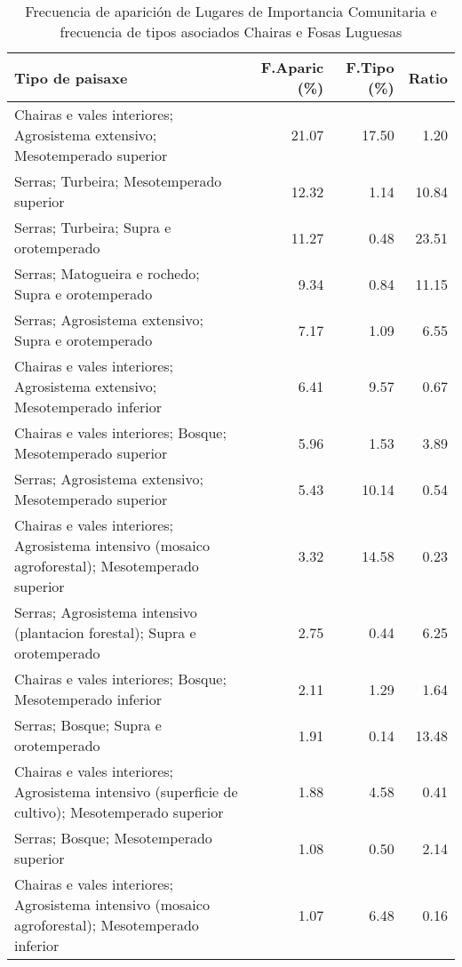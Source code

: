 \begin{table}[p]
\centering
\caption{Frecuencia de aparición de Lugares de Importancia Comunitaria e frecuencia de tipos asociados Chairas e Fosas Luguesas} 
\label{vnatura6}
\begin{tabular}{lrrr}
  \hline
Tipo de paisaxe & F.Aparic (\%) & F.Tipo (\%) & Ratio \\ 
  \hline
Chairas e vales interiores; Agrosistema extensivo; Mesotemperado superior & 21.07 & 17.50 & 1.20 \\ 
  Serras; Turbeira; Mesotemperado superior & 12.32 & 1.14 & 10.84 \\ 
  Serras; Turbeira; Supra e orotemperado & 11.27 & 0.48 & 23.51 \\ 
  Serras; Matogueira e rochedo; Supra e orotemperado & 9.34 & 0.84 & 11.15 \\ 
  Serras; Agrosistema extensivo; Supra e orotemperado & 7.17 & 1.09 & 6.55 \\ 
  Chairas e vales interiores; Agrosistema extensivo; Mesotemperado inferior & 6.41 & 9.57 & 0.67 \\ 
  Chairas e vales interiores; Bosque; Mesotemperado superior & 5.96 & 1.53 & 3.89 \\ 
  Serras; Agrosistema extensivo; Mesotemperado superior & 5.43 & 10.14 & 0.54 \\ 
  Chairas e vales interiores; Agrosistema intensivo (mosaico agroforestal); Mesotemperado superior & 3.32 & 14.58 & 0.23 \\ 
  Serras; Agrosistema intensivo (plantacion forestal); Supra e orotemperado & 2.75 & 0.44 & 6.25 \\ 
  Chairas e vales interiores; Bosque; Mesotemperado inferior & 2.11 & 1.29 & 1.64 \\ 
  Serras; Bosque; Supra e orotemperado & 1.91 & 0.14 & 13.48 \\ 
  Chairas e vales interiores; Agrosistema intensivo (superficie de cultivo); Mesotemperado superior & 1.88 & 4.58 & 0.41 \\ 
  Serras; Bosque; Mesotemperado superior & 1.08 & 0.50 & 2.14 \\ 
  Chairas e vales interiores; Agrosistema intensivo (mosaico agroforestal); Mesotemperado inferior & 1.07 & 6.48 & 0.16 \\ 
   \hline
\end{tabular}
\end{table}
